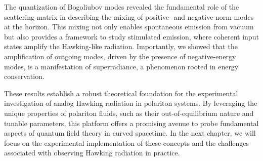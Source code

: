 The quantization of Bogoliubov modes revealed the fundamental role of the scattering matrix in describing the mixing of positive- and negative-norm modes at the horizon. This mixing not only enables spontaneous emission from vacuum but also provides a framework to study stimulated emission, where coherent input states amplify the Hawking-like radiation. Importantly, we showed that the amplification of outgoing modes, driven by the presence of negative-energy modes, is a manifestation of superradiance, a phenomenon rooted in energy conservation.

These results establish a robust theoretical foundation for the experimental investigation of analog Hawking radiation in polariton systems. By leveraging the unique properties of polariton fluids, such as their out-of-equilibrium nature and tunable parameters, this platform offers a promising avenue to probe fundamental aspects of quantum field theory in curved spacetime. In the next chapter, we will focus on the experimental implementation of these concepts and the challenges associated with observing Hawking radiation in practice.